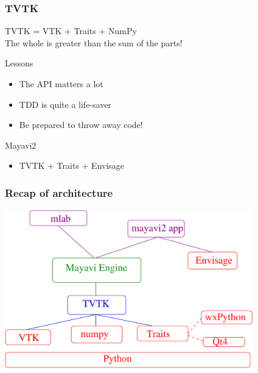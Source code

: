 \begin{frame}
    \frametitle{TVTK}
    \Large
    \begin{center}
        TVTK = VTK + Traits + NumPy\\
        \vspace*{1in}
        The whole is greater than the sum of the parts!
    \end{center}
\end{frame}

\begin{frame}{Lessons}
    \Large
    \begin{itemize}
        \item The API matters a lot
        \item TDD is quite a life-saver
        \item Be prepared to throw away code!
    \end{itemize}
\end{frame}

\begin{frame}{Mayavi2}
  \Large
  \begin{itemize}
  \item  TVTK + Traits + Envisage
  \end{itemize}
\end{frame}

\begin{frame}
  \frametitle{Recap of architecture}
    \includegraphics[width=4.25in]{MEDIA/m2/layers.pdf}

\end{frame}

